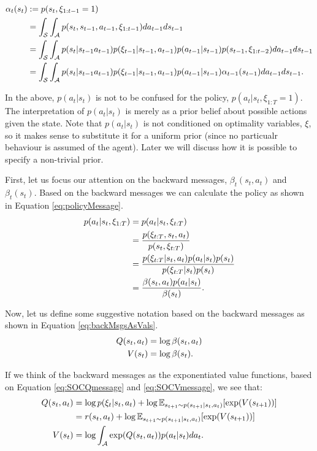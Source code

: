 \documentclass{report}
\numberwithin{equation}{section}
\numberwithin{figure}{section}
\numberwithin{table}{section}
\numberwithin{algorithm}{section}
\begin{document}
\begin{align}\label{eq:SOCforwardMessage}
  \alpha_t(s_t)&:=p(s_t, \xi_{1:t-1}=1)\notag\\
  &=\int_{\mathcal{S}}\int_{\mathcal{A}}p(s_t, s_{t-1},a_{t-1},\xi_{1:t-1})da_{t-1}ds_{t-1}\notag\\
  &=\int_{\mathcal{S}}\int_{\mathcal{A}}p(s_t|s_{t-1}a_{t-1})p(\xi_{t-1}|s_{t-1},a_{t-1})p(a_{t-1}|s_{t-1})p(s_{t-1}, \xi_{1:t-2})da_{t-1}ds_{t-1}\notag\\
  &=\int_{\mathcal{S}}\int_{\mathcal{A}}p(s_t|s_{t-1}a_{t-1})p(\xi_{t-1}|s_{t-1},a_{t-1})p(a_{t-1}|s_{t-1})\alpha_{t-1}(s_{t-1})da_{t-1}ds_{t-1}.
\end{align}

In the above, $p(a_t|s_t)$ is not to be confused for the policy, 
$p(a_t|s_t, \xi_{1:T}=1)$. The interpretation of $p(a_t|s_t)$ 
is merely as a prior belief about possible actions given the state. 
Note that $p(a_t|s_t)$ is not conditioned on optimality variables, 
$\xi$, so it makes sense to substitute it for a uniform prior 
(since no particualr behaviour is assumed of the agent). Later 
we will discuss how it is possible to specify a non-trivial prior.


First, let us focus our attention on the backward messages, 
$\beta_t(s_t, a_t)$ and $\beta_t(s_t)$. 
Based on the backward messages we can calculate the policy as 
shown in Equation \ref{eq:policyMessage}.
\begin{align}\label{eq:policyMessage}
  p(a_t|s_t,\xi_{1:T})&=p(a_t|s_t,\xi_{t:T})\notag\\
  &=\frac{p(\xi_{t:T},s_t,a_t)}{p(s_t,\xi_{t:T})}\notag\\
  &=\frac{p(\xi_{t:T}|s_t, a_t)p(a_t|s_t)p(s_t)}{p(\xi_{t:T}|s_t)p(s_t)}\notag\\
  &=\frac{\beta(s_t, a_t)p(a_t|s_t)}{\beta(s_t)}.
\end{align}

Now, let us define some 
suggestive notation based on the backward messages as shown 
in Equation \ref{eq:backMsgsAsVals}.
\begin{align}\label{eq:backMsgsAsVals}
  Q(s_t, a_t)&=\log \beta(s_t, a_t)\notag\\
  V(s_t)&=\log \beta(s_t).
\end{align}

If we think of the backward messages as the exponentiated 
value functions, based on Equation \ref{eq:SOCQmessage} and 
\ref{eq:SOCVmessage}, we see that:
\begin{align}\label{eq:badVals}
  Q(s_t, a_t)&=\log p(\xi_t|s_t, a_t) + \log\mathbb{E}_{s_{t+1}\sim p(s_{t+1}|s_t, a_t)}[\exp (V(s_{t+1}))]\notag\\
  &=r(s_t, a_t) + \log\mathbb{E}_{s_{t+1}\sim p(s_{t+1}|s_t, a_t)}[\exp (V(s_{t+1}))]\notag\\
  V(s_t)&=\log \int_{\mathcal{A}}\exp (Q(s_t, a_t))p(a_t|s_t)da_t.
\end{align}
\end{document}
